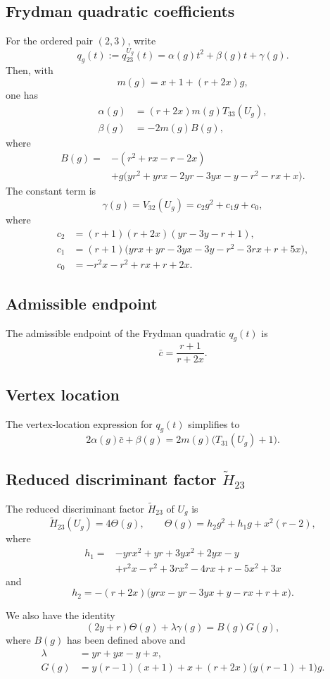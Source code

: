\documentclass[11pt,onecolumn]{amsart}
\theoremstyle{plain}
\theoremstyle{definition}
\theoremstyle{remark}
\begin{document}
\subsection*{Frydman quadratic coefficients}
For the ordered pair $(2,3)$, write
\[
q_g(t):=q_{23}^{U_g}(t)=\alpha(g)t^2+\beta(g)t+\gamma(g).
\]
Then, with
\[
m(g)=x+1+(r+2x)g,
\]
one has
\begin{align*}
\alpha(g) &=(r+2x)m(g)T_{33}(U_g),\\
\beta(g) &=-2m(g)B(g),
\end{align*}
where
\[
\begin{aligned}
B(g)={}&-(r^2+rx-r-2x)\\
&+g\bigl(yr^2+yrx-2yr-3yx-y-r^2-rx+x\bigr).
\end{aligned}
\]
The constant term is
\[
\gamma(g)=V_{32}(U_g)=c_2g^2+c_1g+c_0,
\]
where
\begin{align*}
c_2 &=(r+1)(r+2x)(yr-3y-r+1),\\
c_1 &=(r+1)\bigl(yrx+yr-3yx-3y-r^2-3rx+r+5x\bigr),\\
c_0 &=-r^2x-r^2+rx+r+2x.
\end{align*}

\subsection*{Admissible endpoint}
The admissible endpoint of the Frydman quadratic $q_g(t)$ is
\[
\bar c=\frac{r+1}{r+2x}.
\]

\subsection*{Vertex location}
The vertex-location expression for $q_g(t)$ simplifies to
\[
2\alpha(g)\bar c+\beta(g)
=2m(g)\bigl(T_{31}(U_g)+1\bigr).
\]

\subsection*{Reduced discriminant factor $\widetilde H_{23}$}
The reduced discriminant factor $\widetilde H_{23}$ of $U_g$ is
\[
\widetilde H_{23}(U_g)=4\Theta(g),
\qquad
\Theta(g)=h_2g^2+h_1g+x^2(r-2),
\]
where
\[
\begin{aligned}
h_1={}&-yrx^2+yr+3yx^2+2yx-y\\
&+r^2x-r^2+3rx^2-4rx+r-5x^2+3x
\end{aligned}
\]
and
\[
h_2=-(r+2x)\bigl(yrx-yr-3yx+y-rx+r+x\bigr).
\]

We also have the identity 
\[
(2y+r)\Theta(g)+\lambda\gamma(g)=B(g)G(g),
\]
where $B(g)$ has been defined above and 
\begin{align*}
\lambda &=yr+yx-y+x,\\
G(g) &=y(r-1)(x+1)+x
+(r+2x)\bigl(y(r-1)+1\bigr)g.
\end{align*}
\end{document}
